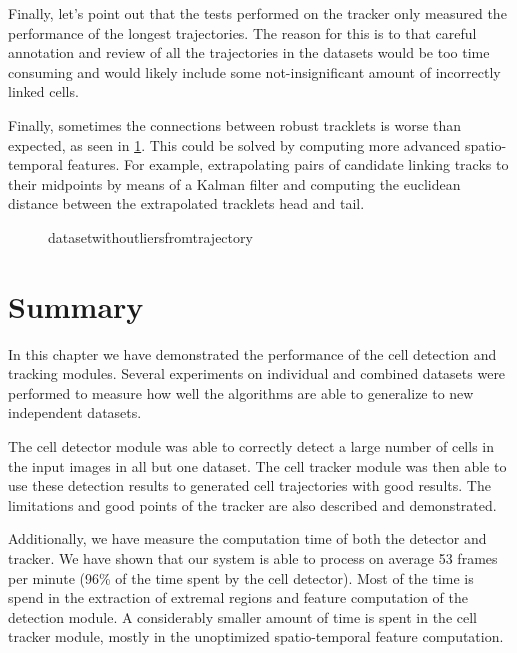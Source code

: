 	Finally, let's point out that the tests performed on the tracker only measured the performance of the longest trajectories. The reason for this is to that careful annotation and review of all the trajectories in the datasets would be too time consuming and would likely include some not-insignificant amount of incorrectly linked cells.
	
	Finally, sometimes the connections between robust tracklets is worse than expected, as seen in \cref{fig:tracking_results_datasetwithoutliersfromtrajectory}. This could be solved by computing more advanced spatio-temporal features. For example, extrapolating pairs of candidate linking tracks to their midpoints by means of a Kalman filter and computing the euclidean distance between the extrapolated tracklets head and tail.
	
	\begin{figure}[h]
		\centering
		\caption{datasetwithoutliersfromtrajectory}
		\label{fig:tracking_results_datasetwithoutliersfromtrajectory}
	\end{figure}
	
\section{Summary \statusnew}
	\label{sec:results_summary}
	
	In this chapter we have demonstrated the performance of the cell detection and tracking modules. Several experiments on individual and combined datasets were performed to measure how well the algorithms are able to generalize to new independent datasets.
	
	The cell detector module was able to correctly detect a large number of cells in the input images in all but one dataset. The cell tracker module was then able to use these detection results to generated cell trajectories with good results. The limitations and good points of the tracker are also described and demonstrated.

	Additionally, we have measure the computation time of both the detector and tracker. We have shown that our system is able to process on average 53 frames per minute (96\% of the time spent by the cell detector). Most of the time is spend in the extraction of extremal regions and feature computation of the detection module. A considerably smaller amount of time is spent in the cell tracker module, mostly in the unoptimized spatio-temporal feature computation.